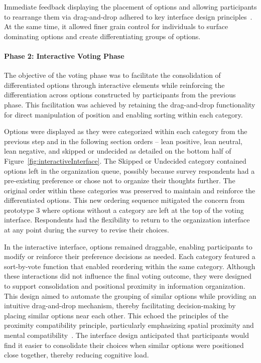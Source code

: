 Immediate feedback displaying the placement of options and allowing participants to rearrange them via drag-and-drop adhered to key interface design principles~\cite{norman2013design}. At the same time, it allowed finer grain control for individuals to surface dominating options and create differentiating groups of options.

\paragraph{Phase 2: Interactive Voting Phase}

The objective of the voting phase was to facilitate the consolidation of differentiated options through interactive elements while reinforcing the differentiation across options constructed by participants from the previous phase. This facilitation was achieved by retaining the drag-and-drop functionality for direct manipulation of position and enabling sorting within each category.

Options were displayed as they were categorized within each category from the previous step and in the following section orders -- lean positive, lean neutral, lean negative, and skipped or undecided as detailed on the bottom half of Figure~\ref{fig:interactiveInterface}. The Skipped or Undecided category contained options left in the organization queue, possibly because survey respondents had a pre-existing preference or chose not to organize their thoughts further. The original order within these categories was preserved to maintain and reinforce the differentiated options. This new ordering sequence mitigated the concern from prototype 3 where options without a category are left at the top of the voting interface. Respondents had the flexibility to return to the organization interface at any point during the survey to revise their choices.

In the interactive interface, options remained draggable, enabling participants to modify or reinforce their preference decisions as needed. Each category featured a sort-by-vote function that enabled reordering within the same category. Although these interactions did not influence the final voting outcome, they were designed to support consolidation and positional proximity in information organization. This design aimed to automate the grouping of similar options while providing an intuitive drag-and-drop mechanism, thereby facilitating decision-making by placing similar options near each other. This echoed the principles of the proximity compatibility principle, particularly emphasizing spatial proximity and mental compatibility~\cite{wickens1990proximity}. The interface design anticipated that participants would find it easier to consolidate their choices when similar options were positioned close together, thereby reducing cognitive load.

